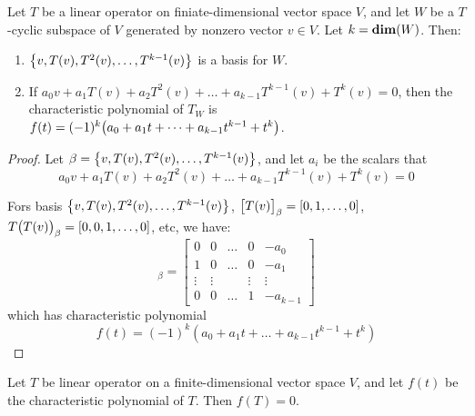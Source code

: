 \begin{theorem}
    Let $T$ be a linear operator on finiate-dimensional vector space $V$, and let $W$ be a $T$-cyclic subspace of $V$ generated by nonzero vector $v \in V$. Let $k = \dimension{W}$. Then:
    \begin{enumerate}
        \item $\set{v, T(v), T^2(v), \dots, T^{k-1}(v)}$ is a basis for $W$.
        \item If $a_0 v + a_1 T(v) + a_2 T^2(v) + \dots + a_{k-1} T^{k-1}(v) + T^k(v) = 0$, then the characteristic polynomial of $T_W$ is $f(t) = (-1)^k \mleft( a_0 + a_1 t + \dots + a_{k-1} t^{k-1} + t^k \mright)$.
    \end{enumerate}
\end{theorem}

\begin{proof}
    Let $\beta = \set{v, T(v), T^2(v), \dots, T^{k-1}(v)}$, and let $a_i$ be the scalars that 
    \begin{equation*}
            a_0 v + a_1 T(v) + a_2 T^2(v) + \dots + a_{k-1} T^{k-1}(v) + T^k(v) = 0
    \end{equation*}
    
    Fors basis $\set{v, T(v), T^2(v), \dots, T^{k-1}(v)}$, $\coordinate{T(v)}_\beta = \coordinate{0,1,\dots, 0}$, $T\mleft( T(v)\mright)_\beta = \coordinate{0,0,1,\dots, 0}$, etc, we have:
    \begin{equation*}
        [T_W]_\beta = \begin{bmatrix}
            0 & 0 & \dots & 0 & - a_0 \\
            1 & 0 & \dots & 0 & -a_1\\
            \vdots & \vdots  & & \vdots & \vdots \\
            0 & 0 & \dots & 1 & - a_{k-1}
        \end{bmatrix}
    \end{equation*}
    which has characteristic polynomial
    \begin{equation*}
        f(t) = (-1)^k (a_0 + a_1 t + \dots + a_{k-1} t^{k-1} + t^k)
    \end{equation*}
\end{proof}

\begin{theorem}
    Let $T$ be linear operator on a finite-dimensional vector space $V$, and let $f(t)$ be the characteristic polynomial of $T$. Then $f(T) = 0$.
\end{theorem}

